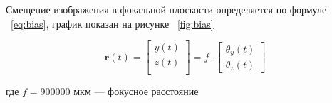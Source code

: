  	Смещение изображения в фокальной плоскости определяется по формуле ~\eqref{eq:bias}, график показан на рисунке ~\ref{fig:bias}
 	
 	\begin{equation}
 		\label{eq:bias}
 		\mathbf{r}(t) = 
 		\begin{bmatrix}
 			y(t) \\
 			z(t) \\
 		\end{bmatrix}
 		= f \cdot
 		\begin{bmatrix}
 			\theta_{y}(t) \\
 			\theta_{z}(t)
 		\end{bmatrix}
 	\end{equation}
 	
 	где \(f=900000\) мкм --- фокусное расстояние
\newpage
 
